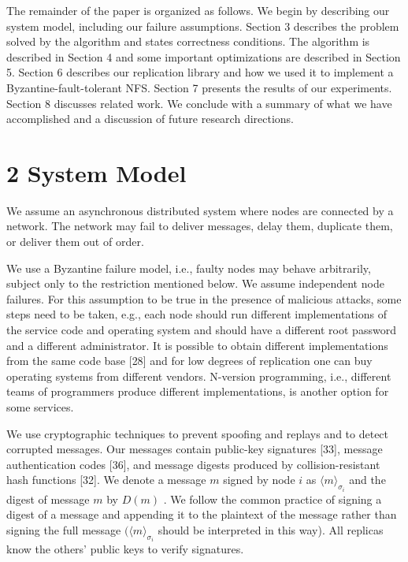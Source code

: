 \documentclass[
]{article}
\begin{document}
The remainder of the paper is organized as follows. We begin by
describing our system model, including our failure assumptions. Section
3 describes the problem solved by the algorithm and states correctness
conditions. The algorithm is described in Section 4 and some important
optimizations are described in Section 5. Section 6 describes our
replication library and how we used it to implement a
Byzantine-fault-tolerant NFS. Section 7 presents the results of our
experiments. Section 8 discusses related work. We conclude with a
summary of what we have accomplished and a discussion of future research
directions.

\section{2 System Model}\label{system-model}

We assume an asynchronous distributed system where nodes are connected
by a network. The network may fail to deliver messages, delay them,
duplicate them, or deliver them out of order.

We use a Byzantine failure model, i.e., faulty nodes may behave
arbitrarily, subject only to the restriction mentioned below. We assume
independent node failures. For this assumption to be true in the
presence of malicious attacks, some steps need to be taken, e.g., each
node should run different implementations of the service code and
operating system and should have a different root password and a
different administrator. It is possible to obtain different
implementations from the same code base {[}28{]} and for low degrees of
replication one can buy operating systems from different vendors.
N-version programming, i.e., different teams of programmers produce
different implementations, is another option for some services.

We use cryptographic techniques to prevent spoofing and replays and to
detect corrupted messages. Our messages contain public-key signatures
{[}33{]}, message authentication codes {[}36{]}, and message digests
produced by collision-resistant hash functions {[}32{]}. We denote a
message \(m\) signed by node \(i\) as \(\langle m \rangle_{\sigma_i}\)
and the digest of message \(m\) by \(D(m)\) . We follow the common
practice of signing a digest of a message and appending it to the
plaintext of the message rather than signing the full message
\((\langle m \rangle_{\sigma_i}\) should be interpreted in this way).
All replicas know the others' public keys to verify signatures.
\end{document}

